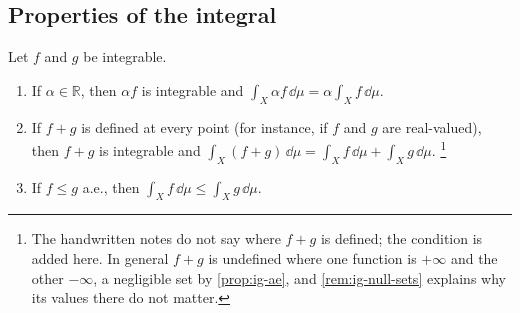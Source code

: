 \subsection{Properties of the integral}\label{sec:ig-properties}

\begin{proposition}\label{prop:ig-linearity}
Let $f$ and $g$ be integrable.
\begin{enumerate}[label=\arabic*)]
  \item If $\alpha\in\mathbb R$, then $\alpha f$ is integrable and
    $\int_X\alpha f\,\dd\mu=\alpha\int_Xf\,\dd\mu$.
  \item If $f+g$ is defined at every point (for instance, if $f$ and $g$ are real-valued),
    then $f+g$ is integrable and
    $\int_X(f+g)\,\dd\mu=\int_Xf\,\dd\mu+\int_Xg\,\dd\mu$.%
    \footnote{The handwritten notes do not say where $f+g$ is defined; the condition is added
    here. In general $f+g$ is undefined where one function is $+\infty$ and the other
    $-\infty$, a negligible set by \cref{prop:ig-ae}, and \cref{rem:ig-null-sets} explains
    why its values there do not matter.}
  \item If $f\le g$ a.e., then $\int_Xf\,\dd\mu\le\int_Xg\,\dd\mu$.
\end{enumerate}
\end{proposition}

